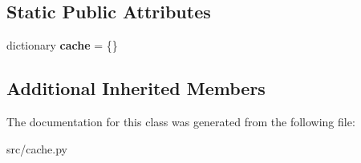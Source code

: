 \subsection*{Static Public Attributes}
\begin{DoxyCompactItemize}
\item 
\hypertarget{classsrc_1_1cache_1_1_image_cache_a6e7f4a18c626219560110f3c1d427617}{}\label{classsrc_1_1cache_1_1_image_cache_a6e7f4a18c626219560110f3c1d427617} 
dictionary {\bfseries cache} = \{\}
\end{DoxyCompactItemize}
\subsection*{Additional Inherited Members}


The documentation for this class was generated from the following file\+:\begin{DoxyCompactItemize}
\item 
src/cache.\+py\end{DoxyCompactItemize}
